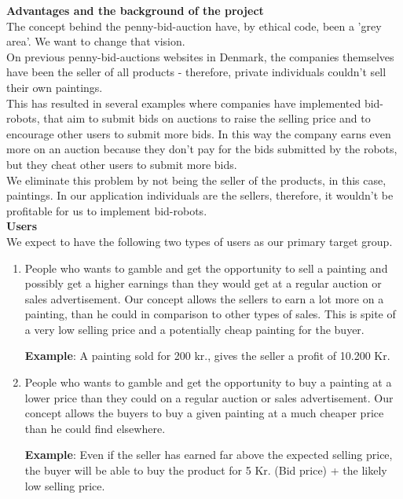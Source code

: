 \textbf{Advantages and the background of the project}\\
The concept behind the penny-bid-auction have, by ethical code, been a 'grey area'. We want to change that vision.\\

On previous penny-bid-auctions websites in Denmark, the companies themselves have been the seller of all products - therefore, private individuals couldn't sell their own paintings.\\

This has resulted in several examples where companies have implemented bid-robots, that aim to submit bids on auctions to raise the selling price and to encourage other users to submit more bids. In this way the company earns even more on an auction because they don't pay for the bids submitted by the robots, but they cheat other users to submit more bids.\\

We eliminate this problem by not being the seller of the products, in this case, paintings. In our application individuals are the sellers, therefore, it wouldn't be profitable for us to implement bid-robots.  \\

\textbf{Users}\\
We expect to have the following two types of users as our primary target group.\\

\begin{enumerate}
\item People who wants to gamble and get the opportunity to sell a painting and possibly get a higher earnings than they would get at a regular auction or sales advertisement.
Our concept allows the sellers to earn a lot more on a painting, than he could in comparison to other types of sales. This is spite of a very low selling price and a potentially cheap painting for the buyer. 

\textbf{Example}: A painting sold for 200 kr., gives the seller a profit of 10.200 Kr.\\
\item People who wants to gamble and get the opportunity to buy a painting at a lower price than they could on a regular auction or sales advertisement. 
Our concept allows the buyers to buy a given painting at a much cheaper price than he could find elsewhere. 

\textbf{Example}: Even if the seller has earned far above the expected selling price, the buyer will be able to buy the product for 5 Kr. (Bid price) + the likely low selling price.\\
\end{enumerate}

